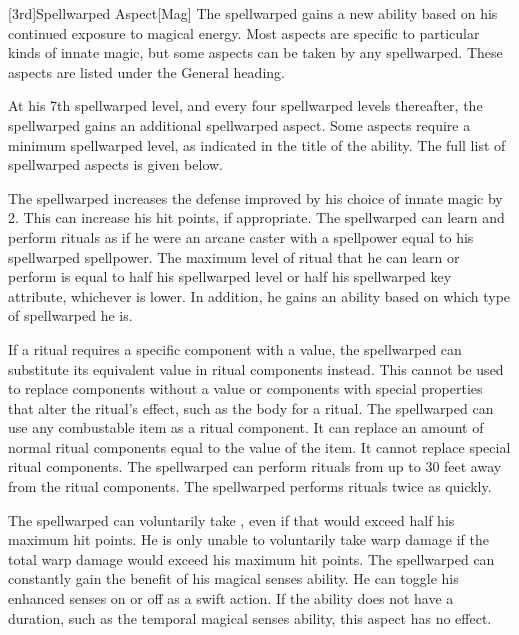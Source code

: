         [3rd]{Spellwarped Aspect}[Mag]
        The spellwarped gains a new ability based on his continued exposure to magical energy.
        Most aspects are specific to particular kinds of innate magic, but some aspects can be taken by any spellwarped.
        These aspects are listed under the General heading.

        At his 7th spellwarped level, and every four spellwarped levels thereafter, the spellwarped gains an additional spellwarped aspect.
        Some aspects require a minimum spellwarped level, as indicated in the title of the ability.
        The full list of spellwarped aspects is given below.


        The spellwarped increases the defense improved by his choice of innate magic by 2.
        This can increase his hit points, if appropriate.
         The spellwarped can learn and perform rituals as if he were an arcane caster with a spellpower equal to his spellwarped spellpower.  The maximum level of ritual that he can learn or perform is equal to half his spellwarped level or half his spellwarped key attribute, whichever is lower.
        In addition, he gains an ability based on which type of spellwarped he is.
        \begin{itemize}
             If a ritual requires a specific component with a value, the spellwarped can substitute its equivalent value in ritual components instead.
                This cannot be used to replace components without a value or components with special properties that alter the ritual's effect, such as the body for a  ritual.
                The spellwarped can use any combustable item as a ritual component.
                It can replace an amount of normal ritual components equal to the value of the item.
                It cannot replace special ritual components.
                The spellwarped can perform rituals from up to 30 feet away from the ritual components.
                The spellwarped performs rituals twice as quickly.
        \end{itemize}
        The spellwarped can voluntarily take , even if that would exceed half his maximum hit points.
        He is only unable to voluntarily take warp damage if the total warp damage would exceed his maximum hit points.
        The spellwarped can constantly gain the benefit of his magical senses ability.
        He can toggle his enhanced senses on or off as a swift action.
        If the ability does not have a duration, such as the temporal magical senses ability, this aspect has no effect.

